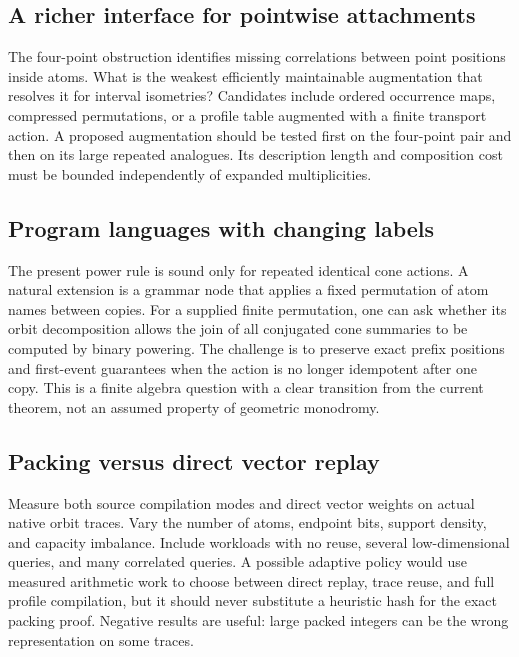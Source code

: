 \subsection{A richer interface for pointwise attachments}

The four-point obstruction identifies missing correlations between point
positions inside atoms. What is the weakest efficiently maintainable
augmentation that resolves it for interval isometries? Candidates include
ordered occurrence maps, compressed permutations, or a profile table
augmented with a finite transport action. A proposed augmentation should be
tested first on the four-point pair and then on its large repeated analogues.
Its description length and composition cost must be bounded independently
of expanded multiplicities.

\subsection{Program languages with changing labels}

The present power rule is sound only for repeated identical cone actions.
A natural extension is a grammar node that applies a fixed permutation of
atom names between copies. For a supplied finite permutation, one can ask
whether its orbit decomposition allows the join of all conjugated cone
summaries to be computed by binary powering. The challenge is to preserve
exact prefix positions and first-event guarantees when the action is no
longer idempotent after one copy. This is a finite algebra question with a
clear transition from the current theorem, not an assumed property of
geometric monodromy.

\subsection{Packing versus direct vector replay}

Measure both source compilation modes and direct vector weights on actual
native orbit traces. Vary the number of atoms, endpoint bits, support
density, and capacity imbalance. Include workloads with no reuse, several
low-dimensional queries, and many correlated queries. A possible adaptive
policy would use measured arithmetic work to choose between direct replay,
trace reuse, and full profile compilation, but it should never substitute
a heuristic hash for the exact packing proof. Negative results are useful:
large packed integers can be the wrong representation on some traces.

